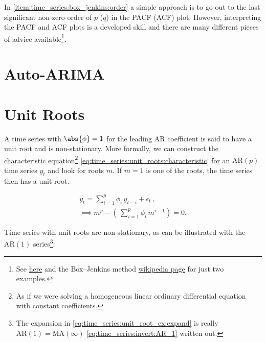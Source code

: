 In \cref{item:time_series:box_jenkins:order} a simple approach is to
go out to the last significant non-zero order of $p$ ($q$) in the PACF (ACF) plot.
However, interpreting the PACF and ACF plots is a developed skill
and there are many different pieces of advice
available\footnote{See
\href{https://people.duke.edu/~rnau/411arim3.htm}{here}
and the Box--Jenkins method
\href{https://en.wikipedia.org/wiki/Box\%E2\%80\%93Jenkins\_method\#Autocorrelation\_and\_partial\_autocorrelation\_plots}{wikipedia page}
for just two examples.}.

\section{Auto-ARIMA}
\label{time_series:auto_ARIMA}

\section{Unit Roots}
\label{time_series:unit_root}

A time series with $\abs{\phi} = 1$ for the leading AR coefficient
is said to have a unit root and is non-stationary.
More formally, we can construct the characteristic
equation\footnote{As if we were solving a
homogeneous linear ordinary differential equation with constant coefficients.} \cref{eq:time_series:unit_roots:characteristic}
for an $\text{AR}\left(p\right)$ time series $y_{t}$ and look for roots $m$.
If $m=1$ is one of the roots, the time series then has a unit root.

\begin{subequations}\label{eq:time_series:unit_roots}
\begin{gather}
y_{t} = \sum_{i=1}^{p} \phi_{i}\, y_{t-i} + \epsilon_{t}\,, \label{eq:time_series:unit_roots:y} \\
\implies m^{p} - \left(\, \sum_{i=1}^{p} \phi_{i}\, m^{i-1} \right) = 0. \label{eq:time_series:unit_roots:characteristic}
\end{gather}
\end{subequations}

Time series with unit roots are non-stationary,
as can be illustrated with the $\text{AR}\left(1\right)$ series\footnote{The expansion
in \cref{eq:time_series:unit_root_ex:expand} is really
$\text{AR}\left(1\right) = \text{MA}\left(\infty\right)$ \cref{eq:time_series:invert:AR_1} written out.}:

